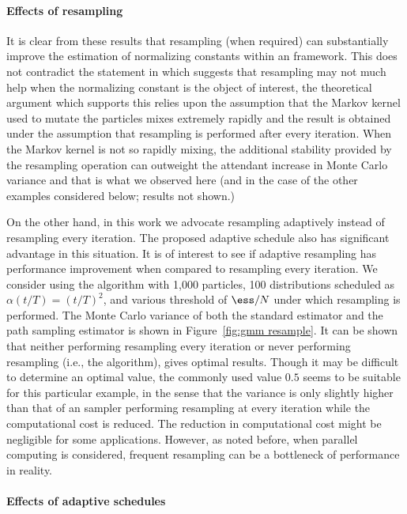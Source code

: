 \paragraph{Effects of resampling}

It is clear from these results that resampling (when required) can
substantially improve the estimation of normalizing constants within an \smc
framework. This does not contradict the statement in \cite{DelMoral:2006hc}
which suggests that resampling may not much help when the normalizing constant
is the object of interest, the theoretical argument which supports this relies
upon the assumption that the Markov kernel used to mutate the particles mixes
extremely rapidly and the result is obtained under the assumption that
resampling is performed after every iteration. When the Markov kernel is not
so rapidly mixing, the additional stability provided by the resampling
operation can outweight the attendant increase in Monte Carlo variance and
that is what we observed here (and in the case of the other examples
considered below; results not shown.)



On the other hand, in this work we advocate resampling adaptively instead of
resampling every iteration. The proposed adaptive schedule also has
significant advantage in this situation. It is of interest to see if adaptive
resampling has performance improvement when compared to resampling every
iteration. We consider using the \smc[2] algorithm with 1,000 particles, 100
distributions scheduled as $\alpha(t/T) = (t/T)^2$, and various threshold of
$\ess/N$ under which resampling is performed. The Monte Carlo variance of both
the standard estimator and the path sampling estimator is shown in
Figure~\ref{fig:gmm resample}. It can be shown that neither performing
resampling every iteration or never performing resampling (i.e., the \ais
algorithm), gives optimal results. Though it may be difficult to determine an
optimal value, the commonly used value $0.5$ seems to be suitable for this
particular example, in the sense that the variance is only slightly higher
than that of an sampler performing resampling at every iteration while the
computational cost is reduced. The reduction in computational cost might be
negligible for some applications. However, as noted before, when parallel
computing is considered, frequent resampling can be a bottleneck of
performance in reality.

\paragraph{Effects of adaptive schedules}

